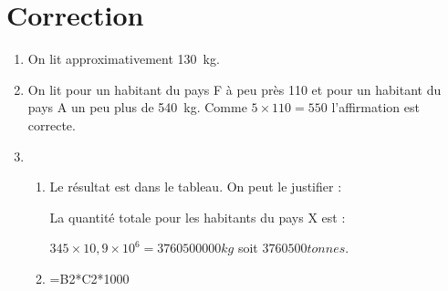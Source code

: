 \documentclass[11pt]{article}
\begin{document}
\newpage

\section*{Correction}

\begin{enumerate}
	\item On lit approximativement 130~kg.
	\item On lit pour un habitant du pays F à peu près 110 et pour un habitant du pays A un peu plus de 540~kg. Comme $5 \times 110 = 550$ l'affirmation est correcte.	
	\item 
	\begin{enumerate}
		\item  Le résultat est dans le tableau. On peut le justifier :
        
        La quantité totale pour les habitants du pays X est :
		
        $345 \times 10,9 \times 10^6 = 3760500000 kg$ soit $3760500 tonnes$.	
		\item \textsf{=B2*C2*1000}
	\end{enumerate}
\end{enumerate}
\end{document}
